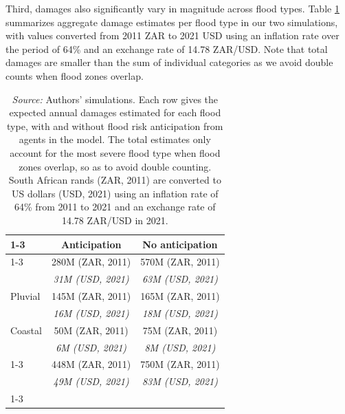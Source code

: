 \documentclass[12pt]{article}
\newcommand\fnote[1]{\captionsetup{justification=raggedright,singlelinecheck=false}\caption*{#1}}
\begin{document}
Third, damages also significantly vary in magnitude across flood types. Table \ref{tab_agg_damage_info} summarizes aggregate damage estimates per flood type in our two simulations, with values converted from 2011 ZAR to 2021 USD using an inflation rate over the period of 64\% and an exchange rate of 14.78 ZAR/USD. Note that total damages are smaller than the sum of individual categories as we avoid double counts when flood zones overlap.

\begin{table}[htbp!]
\centering
\caption{Summary table of aggregate damage estimates w/ and w/o/ anticipation}
\label{tab_agg_damage_info}
\begin{tabular}{lll}
\cline{1-3}
\multicolumn{1}{c}{} &
\multicolumn{1}{c}{Anticipation} &
\multicolumn{1}{c}{No anticipation}\\
\cline{1-3}
\multicolumn{1}{l}{Fluvial} &
\multicolumn{1}{c}{280M (ZAR, 2011)} &
\multicolumn{1}{c}{570M (ZAR, 2011)}\\
\multicolumn{1}{c}{} &
\multicolumn{1}{c}{\textit{31M (USD, 2021)}} &
\multicolumn{1}{c}{\textit{63M (USD, 2021)}}\\
\multicolumn{1}{l}{Pluvial} &
\multicolumn{1}{c}{145M (ZAR, 2011)} &
\multicolumn{1}{c}{165M (ZAR, 2011)}\\
\multicolumn{1}{c}{} &
\multicolumn{1}{c}{\textit{16M (USD, 2021)}} &
\multicolumn{1}{c}{\textit{18M (USD, 2021)}}\\
\multicolumn{1}{l}{Coastal} &
\multicolumn{1}{c}{50M (ZAR, 2011)} &
\multicolumn{1}{c}{75M (ZAR, 2011)}\\
\multicolumn{1}{c}{} &
\multicolumn{1}{c}{\textit{6M (USD, 2021)}} &
\multicolumn{1}{c}{\textit{8M (USD, 2021)}}\\
\cline{1-3}
\multicolumn{1}{l}{Total} &
\multicolumn{1}{c}{448M (ZAR, 2011)} &
\multicolumn{1}{c}{750M (ZAR, 2011)}\\
\multicolumn{1}{c}{} &
\multicolumn{1}{c}{\textit{49M (USD, 2021)}} &
\multicolumn{1}{c}{\textit{83M (USD, 2021)}}\\
\cline{1-3}
\end{tabular}
\fnote{\scriptsize{\textit{Source:} Authors' simulations. Each row gives the expected annual damages estimated for each flood type, with and without flood risk anticipation from agents in the model. The total estimates only account for the most severe flood type when flood zones overlap, so as to avoid double counting. South African rands (ZAR, 2011) are converted to US dollars (USD, 2021) using an inflation rate of 64\% from 2011 to 2021 and an exchange rate of 14.78 ZAR/USD in 2021.}}
\end{table}
\end{document}
